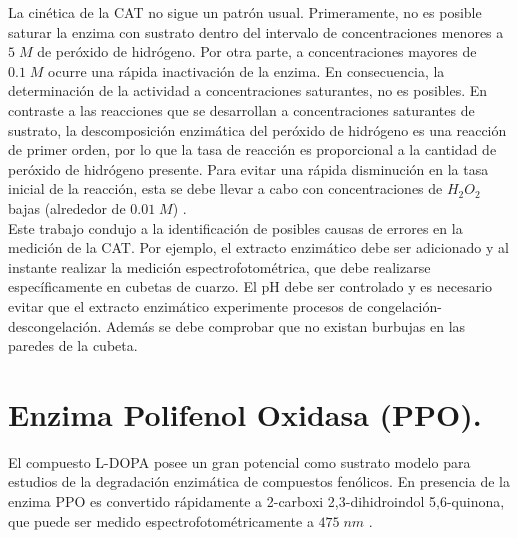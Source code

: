 La cin\'etica de la CAT no sigue un patr\'on usual. Primeramente, no es posible saturar la enzima con sustrato dentro del intervalo de concentraciones menores a $5\;M$ de per\'oxido de hidr\'ogeno. Por otra parte, a concentraciones mayores de $0.1\;M$ ocurre una r\'apida inactivaci\'on de la enzima. En consecuencia, la determinaci\'on de la actividad a concentraciones saturantes, no es posibles. En contraste a las reacciones que se desarrollan a concentraciones saturantes de sustrato, la descomposici\'on enzim\'atica del per\'oxido de hidr\'ogeno es una reacci\'on de primer orden, por lo que la tasa de reacci\'on es proporcional a la cantidad de per\'oxido de hidr\'ogeno presente. Para evitar una r\'apida disminuci\'on en la tasa inicial de la reacci\'on, esta se debe llevar a cabo con concentraciones de $H_2O_2$ bajas (alrededor de $0.01\;M$) \citep{aebi198413}.\\

Este trabajo condujo a la identificaci\'on de posibles causas de errores en la medici\'on de la CAT. Por ejemplo, el extracto enzim\'atico debe ser adicionado y al instante realizar la medici\'on espectrofotom\'etrica, que debe realizarse espec\'ificamente en cubetas de cuarzo. El pH debe ser controlado y es necesario evitar que el extracto enzim\'atico experimente procesos de congelaci\'on-descongelaci\'on. Adem\'as se debe comprobar que no existan burbujas en las paredes de la cubeta. \\ 

%

\section{Enzima Polifenol Oxidasa (PPO).}


El compuesto L-DOPA posee un gran potencial como sustrato modelo para estudios de la degradaci\'on enzim\'atica de compuestos fen\'olicos. En presencia de la enzima PPO es convertido r\'apidamente a 2-carboxi 2,3-dihidroindol 5,6-quinona, que puede ser medido espectrofotom\'etricamente a $475\;nm$ \citep{pind1994enzymic}.\\

